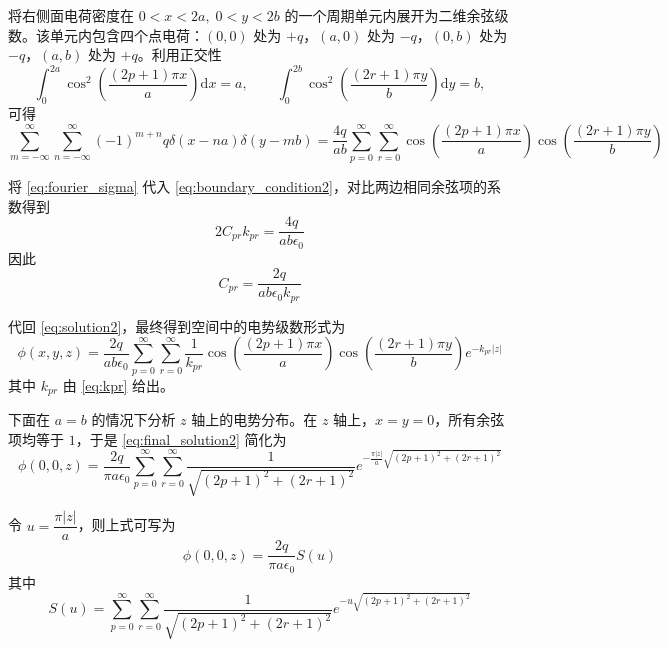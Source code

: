\documentclass[11pt,a4paper]{ctexart}
\newcommand{\dd}{\mathrm{d}}
\begin{document}
将右侧面电荷密度在 $0<x<2a,\;0<y<2b$ 的一个周期单元内展开为二维余弦级数。该单元内包含四个点电荷：$(0,0)$ 处为 $+q$，$(a,0)$ 处为 $-q$，$(0,b)$ 处为 $-q$，$(a,b)$ 处为 $+q$。利用正交性
\[
\int_0^{2a}\cos^2\left(\frac{(2p+1)\pi x}{a}\right)\dd x=a,\qquad
\int_0^{2b}\cos^2\left(\frac{(2r+1)\pi y}{b}\right)\dd y=b,
\]
可得
\begin{equation}
    \sum_{m=-\infty}^{\infty}\sum_{n=-\infty}^{\infty}(-1)^{m+n}q\delta(x-na)\delta(y-mb)
    =\frac{4q}{ab}\sum_{p=0}^{\infty}\sum_{r=0}^{\infty}\cos\left(\frac{(2p+1)\pi x}{a}\right)\cos\left(\frac{(2r+1)\pi y}{b}\right)
    \label{eq:fourier_sigma}
\end{equation}

将 \eqref{eq:fourier_sigma} 代入 \eqref{eq:boundary_condition2}，对比两边相同余弦项的系数得到
\begin{equation}
    2C_{pr}k_{pr}=\frac{4q}{ab\epsilon_0}
    \label{eq:coefficient_relation}
\end{equation}
因此
\begin{equation}
    C_{pr}=\frac{2q}{ab\epsilon_0 k_{pr}}
    \label{eq:Cpr}
\end{equation}

代回 \eqref{eq:solution2}，最终得到空间中的电势级数形式为
\begin{equation}
    \phi(x,y,z)=\frac{2q}{ab\epsilon_0}\sum_{p=0}^{\infty}\sum_{r=0}^{\infty}\frac{1}{k_{pr}}\cos\left(\frac{(2p+1)\pi x}{a}\right)\cos\left(\frac{(2r+1)\pi y}{b}\right)e^{-k_{pr}\left|z\right|}
    \label{eq:final_solution2}
\end{equation}
其中 $k_{pr}$ 由 \eqref{eq:kpr} 给出。

\bigskip

下面在 $a=b$ 的情况下分析 $z$ 轴上的电势分布。在 $z$ 轴上，$x=y=0$，所有余弦项均等于 $1$，于是 \eqref{eq:final_solution2} 简化为
\begin{equation}
    \phi(0,0,z)=\frac{2q}{\pi a\epsilon_0}\sum_{p=0}^{\infty}\sum_{r=0}^{\infty}\frac{1}{\sqrt{(2p+1)^2+(2r+1)^2}}e^{-\frac{\pi\left|z\right|}{a}\sqrt{(2p+1)^2+(2r+1)^2}}
    \label{eq:z_axis_potential}
\end{equation}

令 $u=\dfrac{\pi\left|z\right|}{a}$，则上式可写为
\begin{equation}
    \phi(0,0,z)=\frac{2q}{\pi a\epsilon_0}S(u)
    \label{eq:z_axis_potential_S}
\end{equation}
其中
\[
S(u)=\sum_{p=0}^{\infty}\sum_{r=0}^{\infty}\frac{1}{\sqrt{(2p+1)^2+(2r+1)^2}}e^{-u\sqrt{(2p+1)^2+(2r+1)^2}}
\]
\end{document}
